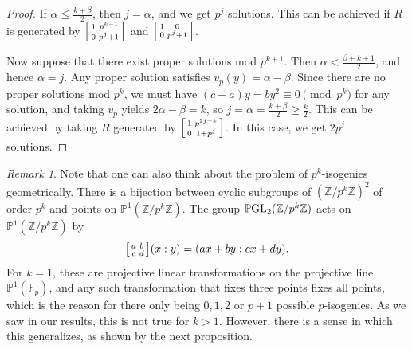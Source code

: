 \documentclass[10pt,leqno]{amsart}
\newcommand\sm[1]{\begin{bsmallmatrix}#1\end{bsmallmatrix}}
\newcommand{\Z}{\mathbb{Z}}
\newcommand{\F}{\mathbb{F}}
\newcommand{\PP}{\mathbb{P}}
\newcommand{\GL}{\textnormal{GL}}
\newtheorem{proposition}[theorem]{Proposition}
\theoremstyle{definition}
\theoremstyle{remark}
\newtheorem{remark}[theorem]{Remark}
\numberwithin{theorem}{section}
\begin{document}
\begin{proof}
    If  $\alpha\leq \frac{k+\beta}{2}$, then $j=\alpha$, and we get $p^j$ solutions.  This can be achieved if $R$ is generated by $\sm{1 & p^{k-1} \\
    0 & p^j+1}$ and $\sm{1 & 0 \\ 0 & p^j+1}$.

    Now suppose that there exist proper solutions mod $p^{k+1}$. Then $\alpha<\frac{\beta+k+1}{2}$, and hence $\alpha=j$. Any proper solution satisfies $v_p(y)=\alpha-\beta$. Since there are no proper solutions mod $p^k$, we must have $(c-a)y=by^2\equiv 0 \pmod{p^k}$ for any solution, and taking $v_p$ yields $2\alpha-\beta=k$, so $j=\alpha=\frac{k+\beta}{2}\geq \frac{k}{2}$. This can be achieved by taking $R$ generated by $\sm{1 & p^{2j-k} \\ 0 & 1+p^j}$. In this case, we get $2p^j$ solutions.
\end{proof}


\begin{remark}
    Note that one can also think about the problem of $p^k$-isogenies geometrically. There is a bijection between cyclic subgroups of $(\Z/p^k\Z)^2$ of order $p^k$ and points on $\PP^1(\Z/p^k\Z)$. The group $\PP \GL_2(\Z/p^k\Z)$ acts on $\PP^1(\Z/p^k\Z)$ by $$\sm{a & b \\c & d}(x:y)=(ax+by: cx+dy).$$ 
    For $k=1$, these are projective linear transformations on the projective line $\PP^1(\F_p)$, and any such transformation that fixes three points fixes all points, which is the reason for there only being $0,1,2$ or $p+1$ possible $p$-isogenies. As we saw in our results, this is not true for $k>1$. However, there is a sense in which this generalizes, as shown by the next proposition.
\end{remark}
\end{document}
